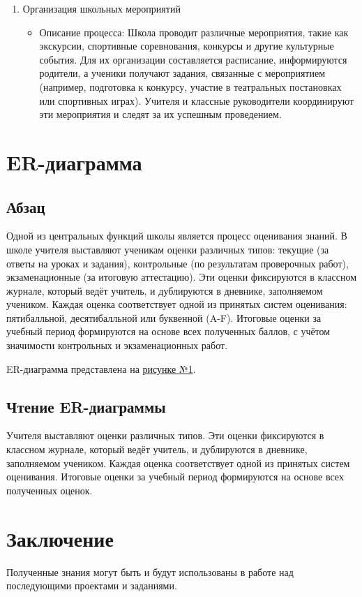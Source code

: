 \documentclass[a4paper, final]{article}
\begin{document}
\begin{enumerate}
  \item Организация школьных мероприятий
  \begin{itemize}
    \item Описание процесса: Школа проводит различные мероприятия, такие как экскурсии, спортивные соревнования, конкурсы и другие культурные события. Для их организации составляется расписание, информируются родители, а ученики получают задания, связанные с мероприятием (например, подготовка к конкурсу, участие в театральных постановках или спортивных играх). Учителя и классные руководители координируют эти мероприятия и следят за их успешным проведением.
  \end{itemize}
\end{enumerate}


\newpage
\section{ER-диаграмма}
\subsection{Абзац}
Одной из центральных функций школы является процесс оценивания знаний. В школе учителя выставляют ученикам оценки различных типов: текущие (за ответы на уроках и задания), контрольные (по результатам проверочных работ), экзаменационные (за итоговую аттестацию). Эти оценки фиксируются в классном журнале, который ведёт учитель, и дублируются в дневнике, заполняемом учеником. Каждая оценка соответствует одной из принятых систем оценивания: пятибалльной, десятибалльной или буквенной (A-F). Итоговые оценки за учебный период формируются на основе всех полученных баллов, с учётом значимости контрольных и экзаменационных работ.


ER-диаграмма представлена на \hyperlink{diag:er}{рисунке №1}.

\newpage
\hypertarget{diag:er}{}

\addtocounter{figure}{1}
\newpage

\subsection{Чтение ER-диаграммы}
Учителя выставляют оценки различных типов. Эти оценки фиксируются в классном журнале, который ведёт учитель, и дублируются в дневнике, заполняемом учеником. Каждая оценка соответствует одной из принятых систем оценивания. Итоговые оценки за учебный период формируются на основе всех полученных оценок.

\newpage
\section*{Заключение}
Полученные знания могут быть и будут использованы в работе над последующими проектами и заданиями.

\cleardoublepage
{}
\newpage
\begin{thebibliography}{0}
\end{thebibliography}
\end{document}
